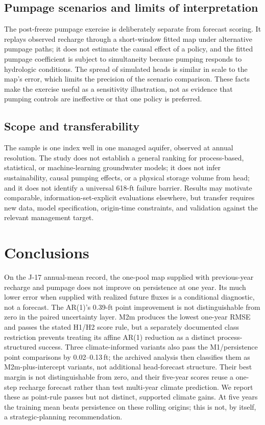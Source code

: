 \documentclass[11pt]{article}
\begin{document}
\subsection{Pumpage scenarios and limits of interpretation}

The post-freeze pumpage exercise is deliberately separate from forecast scoring. It replays observed recharge through a short-window fitted map under alternative pumpage paths; it does not estimate the causal effect of a policy, and the fitted pumpage coefficient is subject to simultaneity because pumping responds to hydrologic conditions. The spread of simulated heads is similar in scale to the map's error, which limits the precision of the scenario comparison. These facts make the exercise useful as a sensitivity illustration, not as evidence that pumping controls are ineffective or that one policy is preferred.

\subsection{Scope and transferability}

The sample is one index well in one managed aquifer, observed at annual resolution. The study does not establish a general ranking for process-based, statistical, or machine-learning groundwater models; it does not infer sustainability, causal pumping effects, or a physical storage volume from head; and it does not identify a universal 618-ft failure barrier. Results may motivate comparable, information-set-explicit evaluations elsewhere, but transfer requires new data, model specification, origin-time constraints, and validation against the relevant management target.

\section{Conclusions}

On the J-17 annual-mean record, the one-pool map supplied with previous-year recharge and pumpage does not improve on persistence at one year. Its much lower error when supplied with realized future fluxes is a conditional diagnostic, not a forecast. The AR(1)'s 0.39-ft point improvement is not distinguishable from zero in the paired uncertainty layer. M2m produces the lowest one-year RMSE and passes the stated H1/H2 score rule, but a separately documented class restriction prevents treating its affine AR(1) reduction as a distinct process-structured success. Three climate-informed variants also pass the M1/persistence point comparisons by 0.02--0.13\,ft; the archived analysis then classifies them as M2m-plus-intercept variants, not additional head-forecast structure. Their best margin is not distinguishable from zero, and their five-year scores reuse a one-step recharge forecast rather than test multi-year climate prediction. We report these as point-rule passes but not distinct, supported climate gains. At five years the training mean beats persistence on these rolling origins; this is not, by itself, a strategic-planning recommendation.
\end{document}
